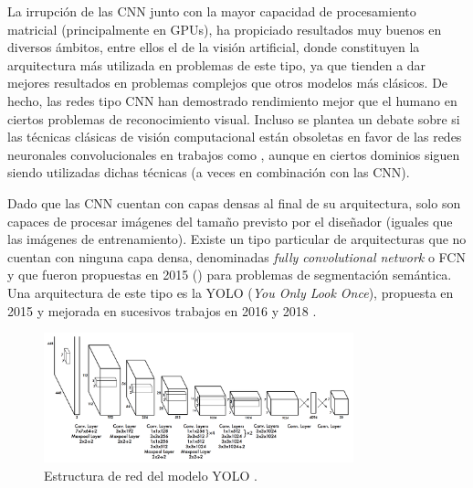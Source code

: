 La irrupción de las CNN junto con la mayor capacidad de procesamiento matricial (principalmente en GPUs), ha propiciado resultados muy buenos en diversos ámbitos, entre ellos el de la visión artificial, donde constituyen la arquitectura más utilizada en problemas de este tipo, ya que tienden a dar mejores resultados en problemas complejos que otros modelos más clásicos. De hecho, las redes tipo CNN han demostrado rendimiento mejor que el humano en ciertos problemas de reconocimiento visual. Incluso se plantea un debate sobre si las técnicas clásicas de visión computacional están obsoletas en favor de las redes neuronales convolucionales en trabajos como \cite{art:o2019deep}, aunque en ciertos dominios siguen siendo utilizadas dichas técnicas (a veces en combinación con las CNN).

Dado que las CNN cuentan con capas densas al final de su arquitectura, solo son capaces de procesar imágenes del tamaño previsto por el diseñador (iguales que las imágenes de entrenamiento). Existe un tipo particular de arquitecturas que no cuentan con ninguna capa densa, denominadas \textit{fully convolutional network} o FCN y que fueron propuestas en 2015 (\citet{art:FCN2015}) para problemas de segmentación semántica. Una arquitectura de este tipo es la YOLO (\textit{You Only Look Once}), propuesta en 2015 \cite{art:yolo} y mejorada en sucesivos trabajos en 2016 \cite{art:yolo2} y 2018 \cite{art:yolo3}.

\begin{figure}
  \centering
  \includegraphics[width=0.8\textwidth]{images/yolo.png}
  \caption{Estructura de red del modelo YOLO \cite{art:yolo}.}
  \label{fig:yoloArch}
\end{figure}

\newpage